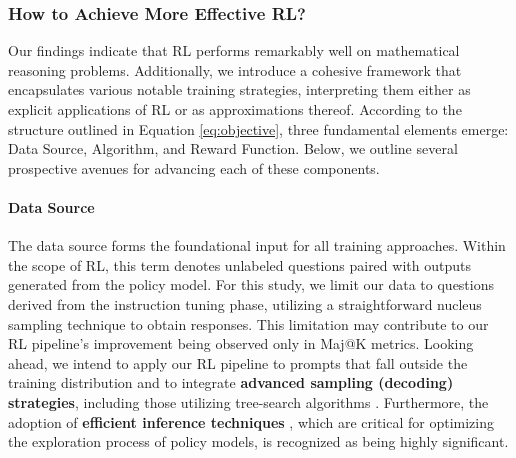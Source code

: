 \begin{itemize}[topsep=0pt]
\begin{itemize}[topsep=0pt]
\subsubsection{How to Achieve More Effective RL?}
\label{sec:effec_rl}
Our findings indicate that RL performs remarkably well on mathematical reasoning problems. Additionally, we introduce a cohesive framework that encapsulates various notable training strategies, interpreting them either as explicit applications of RL or as approximations thereof. According to the structure outlined in Equation \ref{eq:objective}, three fundamental elements emerge: Data Source, Algorithm, and Reward Function. Below, we outline several prospective avenues for advancing each of these components.

\paragraph{Data Source} The data source forms the foundational input for all training approaches. Within the scope of RL, this term denotes unlabeled questions paired with outputs generated from the policy model. For this study, we limit our data to questions derived from the instruction tuning phase, utilizing a straightforward nucleus sampling technique to obtain responses. This limitation may contribute to our RL pipeline’s improvement being observed only in Maj@K metrics. Looking ahead, we intend to apply our RL pipeline to prompts that fall outside the training distribution and to integrate \textbf{advanced sampling (decoding) strategies}, including those utilizing tree-search algorithms \citep{yao2023tree}. Furthermore, the adoption of \textbf{efficient inference techniques} \citep{xia-etal-2023-speculative,leviathan2023fast,kwon2023efficient,xia2024unlocking}, which are critical for optimizing the exploration process of policy models, is recognized as being highly significant.


\end{itemize}
\end{itemize}
